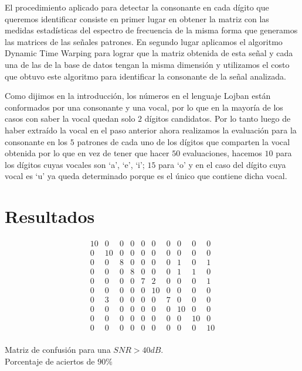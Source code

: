 \documentclass[conference,a4paper,10pt,oneside,final]{tfmpd}
\begin{document}
		El procedimiento aplicado para detectar la consonante en cada dígito que
		queremos identificar consiste en primer lugar en obtener la matriz con
		las medidas estadísticas del espectro de frecuencia de la misma forma
		que generamos las matrices de las señales patrones. En segundo lugar
		aplicamos el algoritmo Dynamic Time Warping  para lograr que la matriz
		obtenida de esta señal y cada una de las de la base de datos tengan la
		misma dimensión  y utilizamos el costo que obtuvo este algoritmo para
		identificar la consonante de la señal analizada.

		Como dijimos en la introducción, los números en el lenguaje Lojban
		están conformados por una consonante y una vocal, por lo que en
		la mayoría de los casos con saber la vocal quedan solo $2$ dígitos
		candidatos. Por lo tanto luego de haber extraído la vocal en el paso
		anterior ahora realizamos la evaluación para la consonante en los $5$
		patrones de cada uno de los dígitos que comparten la vocal obtenida por
		lo que en vez de tener que hacer $50$ evaluaciones, hacemos $10$ para los
		dígitos cuyas vocales son `a', `e', `i'; $15$ para `o' y en el caso del dígito
		cuya vocal es `u' ya queda determinado porque es el único que contiene
		dicha vocal.


\section{Resultados}
	\begin{table}
	\[
		\begin{array}{cccccccccc}
10 & 0 & 0 & 0 & 0 & 0 & 0 & 0 & 0 & 0 \\
0 & 10 & 0 & 0 & 0 & 0 & 0 & 0 & 0 & 0 \\
0 & 0 & 8 & 0 & 0 & 0 & 0 & 1 & 0 & 1 \\
0 & 0 & 0 & 8 & 0 & 0 & 0 & 1 & 1 & 0 \\
0 & 0 & 0 & 0 & 7 & 2 & 0 & 0 & 0 & 1 \\
0 & 0 & 0 & 0 & 0 & 10 & 0 & 0 & 0 & 0 \\
0 & 3 & 0 & 0 & 0 & 0 & 7 & 0 & 0 & 0 \\
0 & 0 & 0 & 0 & 0 & 0 & 0 & 10 & 0 & 0 \\
0 & 0 & 0 & 0 & 0 & 0 & 0 & 0 & 10 & 0 \\
0 & 0 & 0 & 0 & 0 & 0 & 0 & 0 & 0 & 10 \\
		\end{array}
	\]
		\caption{Matriz de confusión para una $SNR > 40dB$.\\
		Porcentaje de aciertos de $90\%$}
		\label{infty}
	\end{table}
\end{document}
